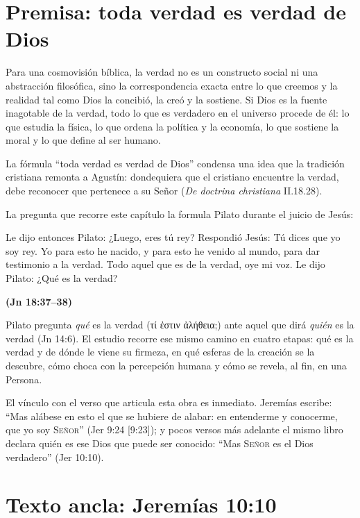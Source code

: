 \documentclass[11pt,letterpaper]{article}
\newcommand{\grc}[1]{\foreignlanguage{ancientgreek}{#1}}
\newcommand{\SENOR}{\textsc{Señor}}
\newcommand{\fuente}[1]{\par\hfill{\upshape\bfseries\small\textcolor{azul}{#1}}}
\begin{document}
\section{Premisa: toda verdad es verdad de Dios}

Para una cosmovisión bíblica, la verdad no es un constructo social ni una abstracción filosófica, sino la correspondencia exacta entre lo que creemos y la realidad tal como Dios la concibió, la creó y la sostiene. Si Dios es la fuente inagotable de la verdad, todo lo que es verdadero en el universo procede de él: lo que estudia la física, lo que ordena la política y la economía, lo que sostiene la moral y lo que define al ser humano.

\begin{nota}[Precisión]
La fórmula ``toda verdad es verdad de Dios'' condensa una idea que la tradición cristiana remonta a Agustín: dondequiera que el cristiano encuentre la verdad, debe reconocer que pertenece a su Señor (\emph{De doctrina christiana} II.18.28).
\end{nota}

La pregunta que recorre este capítulo la formula Pilato durante el juicio de Jesús:

\begin{cita}Le dijo entonces Pilato: ¿Luego, eres tú rey? Respondió Jesús: Tú dices que yo soy rey. Yo para esto he nacido, y para esto he venido al mundo, para dar testimonio a la verdad. Todo aquel que es de la verdad, oye mi voz. Le dijo Pilato: ¿Qué es la verdad?\fuente{(Jn 18:37--38)}\end{cita}

Pilato pregunta \emph{qué} es la verdad (\grc{τί ἐστιν ἀλήθεια;}) ante aquel que dirá \emph{quién} es la verdad (Jn 14:6). El estudio recorre ese mismo camino en cuatro etapas: qué es la verdad y de dónde le viene su firmeza, en qué esferas de la creación se la descubre, cómo choca con la percepción humana y cómo se revela, al fin, en una Persona.

El vínculo con el verso que articula esta obra es inmediato. Jeremías escribe: ``Mas alábese en esto el que se hubiere de alabar: en entenderme y conocerme, que yo soy \SENOR'' (Jer 9:24 [9:23]); y pocos versos más adelante el mismo libro declara quién es ese Dios que puede ser conocido: ``Mas \SENOR{} es el Dios verdadero'' (Jer 10:10).

\section{Texto ancla: Jeremías 10:10}\label{sec:jer10}
\end{document}
